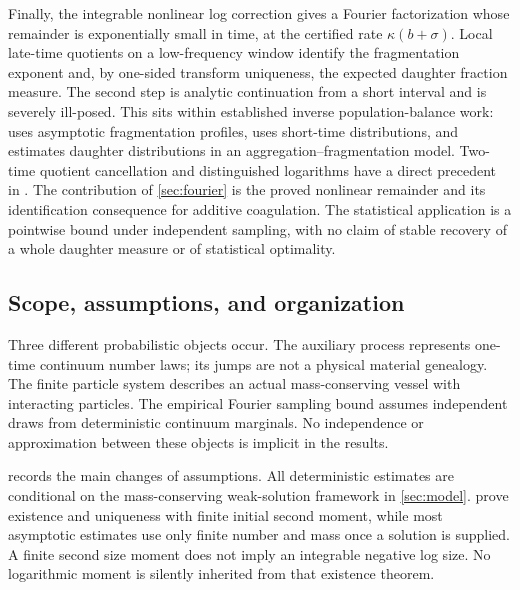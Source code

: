 Finally, the integrable nonlinear log correction gives a Fourier
factorization whose remainder is exponentially small in time, at the
certified rate $\kappa(b+\sigma)$. Local late-time quotients on a
low-frequency window identify the fragmentation exponent and, by
one-sided transform uniqueness, the expected daughter fraction measure.
The second step is analytic continuation from a short interval and is
severely ill-posed. This sits within established
inverse population-balance work: \citet{DoumicEscobedoTournus2018}
uses asymptotic fragmentation profiles,
\citet{DoumicEscobedoTournus2024} uses short-time distributions,
and \citet{MirzaevByrneBortz2016} estimates daughter distributions in
an aggregation--fragmentation model. Two-time quotient cancellation
and distinguished logarithms have a direct precedent in
\citet[Section 2.2]{Garnier2024}. The contribution of
\cref{sec:fourier} is the proved nonlinear remainder and its
identification consequence for additive coagulation. The statistical
application is a pointwise bound under independent sampling,
with no claim of stable recovery of a whole daughter measure or
of statistical optimality.

\subsection{Scope, assumptions, and organization}

Three different probabilistic objects occur. The auxiliary process
represents one-time continuum number laws; its jumps are not a physical
material genealogy. The finite particle system describes an actual
mass-conserving vessel with interacting particles. The empirical Fourier
sampling bound assumes independent draws from deterministic continuum
marginals. No independence or approximation between these objects is
implicit in the results.

 records the main changes of assumptions.
All deterministic estimates are conditional on the mass-conserving
weak-solution framework in \cref{sec:model}.
 prove existence and uniqueness with
finite initial second moment, while most asymptotic estimates use only
finite number and mass once a solution is supplied.
A finite second size moment does not imply an integrable negative
log size. No logarithmic moment is silently inherited from that
existence theorem.


